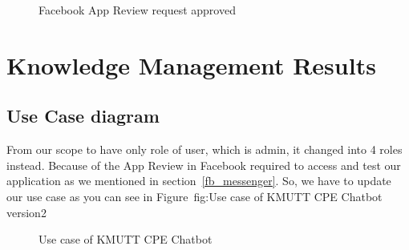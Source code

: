\documentclass[12pt,oneside,openright,a4paper]{cpe-english-project}
\begin{document}
	\begin{figure}[!h]\centering
		\caption{Facebook App Review request approved}\label{fig:app_review_approved}
	\end{figure}

\pagebreak
\section{Knowledge Management Results}
	\subsection{Use Case diagram}
	From our scope to have only role of user, which is admin, it changed into 4 roles instead.
	Because of the App Review in Facebook required to access and test our application
	as we mentioned in section~\ref*{fb_messenger}.
	So, we have to update our use case as you can see in Figure~{fig:Use case of KMUTT CPE Chatbot version2}

	\begin{figure}[!h]\centering
		\caption{Use case of KMUTT CPE Chatbot}\label{fig:Use case of KMUTT CPE Chatbot version2}
	\end{figure}
\end{document}
